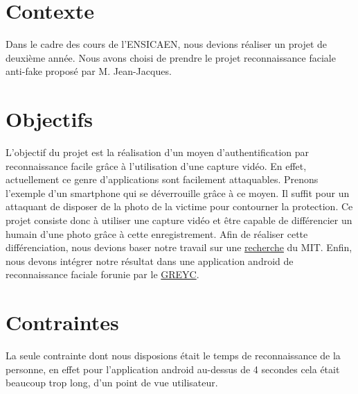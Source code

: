 \section{Contexte}

Dans le cadre des cours de l'ENSICAEN, nous devions réaliser un projet de deuxième année. Nous avons choisi de prendre le projet reconnaissance faciale anti-fake proposé
par M.  Jean-Jacques. 

\section{Objectifs}

L'objectif du projet est la réalisation d'un moyen d'authentification par reconnaissance facile grâce à l'utilisation d'une capture vidéo. En effet, actuellement ce genre d'applications sont facilement 
attaquables. Prenons l'exemple d'un smartphone qui se déverrouille grâce à ce moyen. Il suffit pour un attaquant de disposer de la photo de la victime pour contourner la protection. Ce projet consiste donc 
à utiliser une capture vidéo et être capable de différencier un humain d'une photo grâce à cette enregistrement. Afin de réaliser cette différenciation, nous devions baser notre travail sur une \href{http://people.csail.mit.edu/mrub/papers/vidmag.pdf}{recherche} du MIT. Enfin, nous devons intégrer notre résultat dans une application android de reconnaissance faciale forunie par le \href{https://www.greyc.fr/}{GREYC}.

\section{Contraintes}

La seule contrainte dont nous disposions était le temps de reconnaissance de la personne, en effet pour l'application android au-dessus de 4 secondes cela était beaucoup trop long, d'un point de vue 
utilisateur. 
